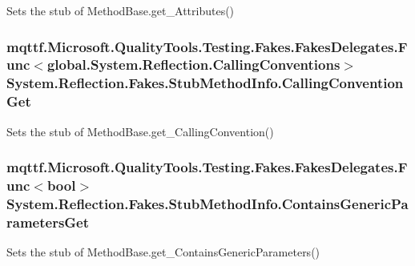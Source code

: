 Sets the stub of Method\-Base.\-get\-\_\-\-Attributes()

\hypertarget{class_system_1_1_reflection_1_1_fakes_1_1_stub_method_info_a3d2500b35a61d45ce73fcb0668e3b85f}{
\subsubsection[{Calling\-Convention\-Get}]{\setlength{\rightskip}{0pt plus 5cm}mqttf.\-Microsoft.\-Quality\-Tools.\-Testing.\-Fakes.\-Fakes\-Delegates.\-Func$<$global.\-System.\-Reflection.\-Calling\-Conventions$>$ System.\-Reflection.\-Fakes.\-Stub\-Method\-Info.\-Calling\-Convention\-Get}}\label{class_system_1_1_reflection_1_1_fakes_1_1_stub_method_info_a3d2500b35a61d45ce73fcb0668e3b85f}


Sets the stub of Method\-Base.\-get\-\_\-\-Calling\-Convention()

\hypertarget{class_system_1_1_reflection_1_1_fakes_1_1_stub_method_info_af2eaee42ba9dfb1b733d7a763ba8f3f9}{
\subsubsection[{Contains\-Generic\-Parameters\-Get}]{\setlength{\rightskip}{0pt plus 5cm}mqttf.\-Microsoft.\-Quality\-Tools.\-Testing.\-Fakes.\-Fakes\-Delegates.\-Func$<$bool$>$ System.\-Reflection.\-Fakes.\-Stub\-Method\-Info.\-Contains\-Generic\-Parameters\-Get}}\label{class_system_1_1_reflection_1_1_fakes_1_1_stub_method_info_af2eaee42ba9dfb1b733d7a763ba8f3f9}


Sets the stub of Method\-Base.\-get\-\_\-\-Contains\-Generic\-Parameters()

